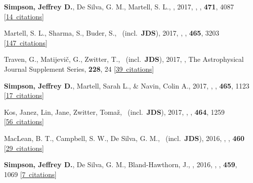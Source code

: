 \item[{\color{numcolor}\scriptsize11}] \textbf{Simpson, Jeffrey D.}, De Silva, G. M., Martell, S. L., \etal, 2017, , \mnras, \textbf{471}, 4087 [\href{https://ui.adsabs.harvard.edu/#abs/2017MNRAS.471.4087S}{14~citations}]

\item[{\color{numcolor}\scriptsize10}] Martell, S. L., Sharma, S., Buder, S., \etal\ (incl.\ \textbf{JDS}), 2017, , \mnras, \textbf{465}, 3203 [\href{https://ui.adsabs.harvard.edu/#abs/2017MNRAS.465.3203M}{147~citations}]

\item[{\color{numcolor}\scriptsize9}] Traven, G., Matijevi{\v{c}}, G., Zwitter, T., \etal\ (incl.\ \textbf{JDS}), 2017, , The Astrophysical Journal Supplement Series, \textbf{228}, 24 [\href{https://ui.adsabs.harvard.edu/#abs/2017ApJS..228...24T}{39~citations}]

\item[{\color{numcolor}\scriptsize8}] \textbf{Simpson, Jeffrey D.}, Martell, Sarah L., \& Navin, Colin A., 2017, , \mnras, \textbf{465}, 1123 [\href{https://ui.adsabs.harvard.edu/#abs/2017MNRAS.465.1123S}{17~citations}]

\item[{\color{numcolor}\scriptsize7}] Kos, Janez, Lin, Jane, Zwitter, Toma{\v{z}}, \etal\ (incl.\ \textbf{JDS}), 2017, , \mnras, \textbf{464}, 1259 [\href{https://ui.adsabs.harvard.edu/#abs/2017MNRAS.464.1259K}{56~citations}]

\item[{\color{numcolor}\scriptsize6}] MacLean, B. T., Campbell, S. W., De Silva, G. M., \etal\ (incl.\ \textbf{JDS}), 2016, , \mnras, \textbf{460} [\href{https://ui.adsabs.harvard.edu/#abs/2016MNRAS.460L..69M}{29~citations}]

\item[{\color{numcolor}\scriptsize5}] \textbf{Simpson, Jeffrey D.}, De Silva, G. M., Bland-Hawthorn, J., \etal, 2016, , \mnras, \textbf{459}, 1069 [\href{https://ui.adsabs.harvard.edu/#abs/2016MNRAS.459.1069S}{7~citations}]

